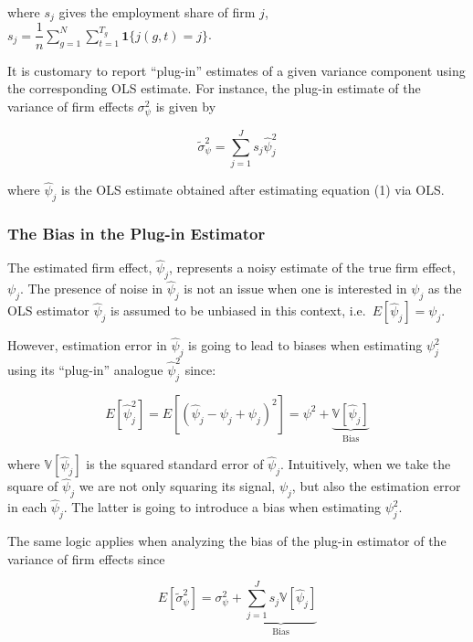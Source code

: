 \documentclass[11pt]{article}
\begin{document}
where $s_{j}$ gives the employment share of firm $j$, $s_{j}=\dfrac{1}{n}\sum_{g=1}^{N}\sum_{t=1}^{T_{g}}\mathbf{1}\{j(g,t)=j\}$.

It is customary to report ``plug-in'' estimates of a given variance
component using the corresponding OLS estimate. For instance, the
plug-in estimate of the variance of firm effects \(\sigma_{\psi }^2\) is
given by

\begin{equation}
\tilde{\sigma}_{\psi}^2=\sum_{j=1}^J s_{j}\hat{\psi}^{2}_{j}
\end{equation}

where \(\hat{\psi}_{j}\) is the OLS estimate obtained after estimating
equation (1) via OLS.

\hypertarget{the-bias-in-the-plug-in-estimator}{%
\subsubsection{The Bias in the Plug-in
Estimator}\label{the-bias-in-the-plug-in-estimator}}

The estimated firm effect, \(\hat{\psi}_{j}\), represents a noisy
estimate of the true firm effect, \(\psi_{j}\). The presence of noise in
\(\hat{\psi}_{j}\) is not an issue when one is interested in
\(\psi_{j}\) as the OLS estimator \(\hat{\psi}_{j}\) is assumed to be
unbiased in this context, i.e.~\(E[\hat{\psi}_{j}]=\psi_{j}\).

However, estimation error in \(\hat{\psi}_{j}\) is going to lead to
biases when estimating \(\psi_{j}^{2}\) using its ``plug-in'' analogue
\(\hat{\psi}_{j}^{2}\) since:

\begin{equation}
E[\hat{\psi}_{j}^{2}]=E[(\hat{\psi}_{j}-\psi_{j}+\psi_{j})^2]=\psi^{2}+\underbrace{\mathbb{V}[\hat{\psi}_{j}]}_{\text{Bias}}
\end{equation}

where \(\mathbb{V}[\hat{\psi}_{j}]\) is the squared standard error of
\(\hat{\psi}_{j}\). Intuitively, when we take the square of
\(\hat{\psi}_{j}\) we are not only squaring its signal, \(\psi_{j}\),
but also the estimation error in each \(\hat{\psi}_{j}\). The latter is
going to introduce a bias when estimating \(\psi^{2}_{j}\).

The same logic applies when analyzing the bias of the plug-in estimator
of the variance of firm effects since

\begin{equation}
E[\tilde{\sigma}_{\psi}^2]=\sigma^{2}_{\psi}+\underbrace{\sum_{j=1}^{J}s_{j}{\mathbb{V}[\hat{\psi}_{j}]}}_{\text{Bias}}
\end{equation}
\end{document}
